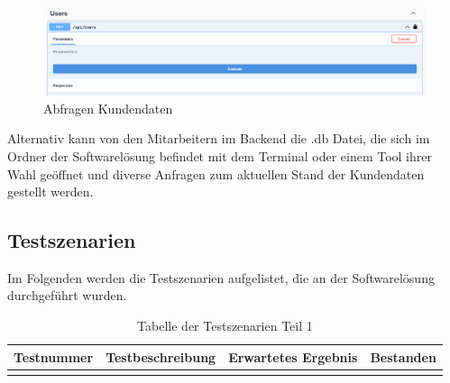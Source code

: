 \begin{figure}[h]
	\centering
	\includegraphics[width=0.9\linewidth]{Images/Projekt_Messe_Swagger3}
	\caption{Abfragen Kundendaten}
	\label{fig:projektmesseswagger3}
\end{figure}

Alternativ kann von den Mitarbeitern im Backend die .db Datei, die sich im Ordner der Softwarelösung befindet mit dem Terminal oder einem Tool ihrer Wahl geöffnet und diverse Anfragen zum aktuellen Stand der Kundendaten gestellt werden.

\newpage
\subsection{Testszenarien}

Im Folgenden werden die Testszenarien aufgelistet, die an der Softwarelösung durchgeführt wurden.

\begin{table}[h]
	\centering
	\begin{tabular}{|c|c|c|c|}
		\hline
		Testnummer & Testbeschreibung & Erwartetes Ergebnis & Bestanden \\ \hline
		&&& \\ \hline
	\end{tabular}
	\caption{Tabelle der Testszenarien Teil 1}
\end{table}



